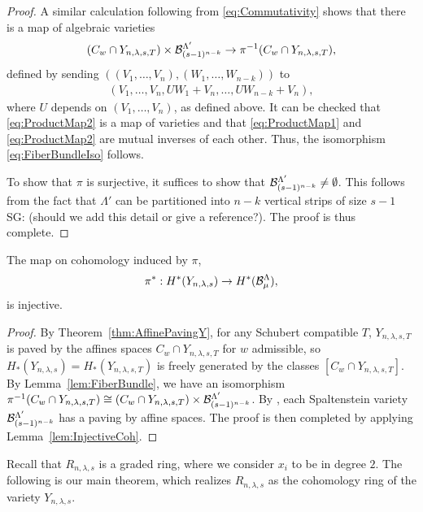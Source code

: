 \documentclass[12pt]{amsart}
\newcommand{\la}{\lambda}
\newcommand{\SG}[1]{{\color{red} SG: #1}}
\begin{document}
\begin{proof}
A similar calculation following from \eqref{eq:Commutativity} shows that there is a map of algebraic varieties
\begin{align}\label{eq:ProductMap2}
(C_{w}\cap Y_{n,\la,s,T})\times \cB_{(s-1)^{n-k}}^{\Lambda'}\to \pi^{-1}(C_{w}\cap Y_{n,\la,s,T}),
\end{align}
defined by sending $((V_1,\dots, V_n),(W_1,\dots, W_{n-k}))$ to 
\begin{align}
(V_1,\dots, V_n,UW_1+V_n,\dots, UW_{n-k}+V_n),
\end{align}
 where $U$ depends on $(V_1,\dots, V_n)$, as defined above.
 It can be checked that \eqref{eq:ProductMap2} is a map of varieties and that \eqref{eq:ProductMap1} and \eqref{eq:ProductMap2} are mutual inverses of each other. Thus, the isomorphism \eqref{eq:FiberBundleIso} follows.
 
To show that $\pi$ is surjective, it suffices to show that $\mathcal{B}_{(s-1)^{n-k}}^{\Lambda'}\neq \emptyset$. This follows from the fact that $\Lambda'$ can be partitioned into $n-k$ vertical strips of size $s-1$ \SG{(should we add this detail or give a reference?)}. The proof is thus complete.
\end{proof}

\begin{lemma}\label{lem:InjCohomology}
The map on cohomology induced by $\pi$,
\begin{align}
\pi^* : H^*(Y_{n,\la,s}) \to H^*(\cB_\mu^\Lambda),
\end{align}
is injective.
\end{lemma}

\begin{proof}
By Theorem~\ref{thm:AffinePavingY}, for any Schubert compatible $T$, $Y_{n,\la,s,T}$ is paved by the affines spaces $C_{w}\cap Y_{n,\la,s,T}$ for $w$ admissible, so $H_*(Y_{n,\la,s}) = H_*(Y_{n,\la,s,T})$ is freely generated by the classes $[C_w\cap Y_{n,\la,s,T}]$. By Lemma~\ref{lem:FiberBundle}, we have an isomorphism $\pi^{-1}(C_{w}\cap Y_{n,\la,s,T}) \cong (C_{w}\cap Y_{n,\la,s,T})\times \cB_{(s-1)^{n-k}}^{\Lambda'}$. By \cite{Brundan-Ostrik}, each Spaltenstein variety $\mathcal{B}_{(s-1)^{n-k}}^{\Lambda'}$ has a paving by affine spaces. The proof is then completed by applying Lemma~\ref{lem:InjectiveCoh}.
\end{proof}

Recall that $R_{n,\la,s}$ is a graded ring, where we consider $x_i$ to be in degree $2$. The following is our main theorem, which realizes $R_{n,\la,s}$ as the cohomology ring of the variety $Y_{n,\la,s}$.
\end{document}
